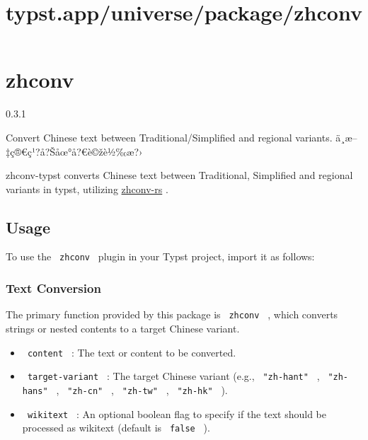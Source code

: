 \title{typst.app/universe/package/zhconv}

\label{banner}
\section{zhconv}\label{zhconv}

{ 0.3.1 }

Convert Chinese text between Traditional/Simplified and regional
variants. ä¸­æ--‡ç®€ç¹?å?Šåœ°å?€è©žè½‰æ?›

\label{readme}
zhconv-typst converts Chinese text between Traditional, Simplified and
regional variants in typst, utilizing
\href{https://github.com/Gowee/zhconv-rs}{zhconv-rs} .

\subsection{Usage}\label{usage}

To use the \texttt{\ zhconv\ } plugin in your Typst project, import it
as follows:

\begin{Shaded}
\begin{Highlighting}[]
\end{Highlighting}
\end{Shaded}

\subsubsection{Text Conversion}\label{text-conversion}

The primary function provided by this package is \texttt{\ zhconv\ } ,
which converts strings or nested contents to a target Chinese variant.

\begin{Shaded}
\begin{Highlighting}[]
\end{Highlighting}
\end{Shaded}

\begin{itemize}
\tightlist
\item
  \texttt{\ content\ } : The text or content to be converted.
\item
  \texttt{\ target-variant\ } : The target Chinese variant (e.g.,
  \texttt{\ "zh-hant"\ } , \texttt{\ "zh-hans"\ } , \texttt{\ "zh-cn"\ }
  , \texttt{\ "zh-tw"\ } , \texttt{\ "zh-hk"\ } ).
\item
  \texttt{\ wikitext\ } : An optional boolean flag to specify if the
  text should be processed as wikitext (default is \texttt{\ false\ } ).
\end{itemize}

